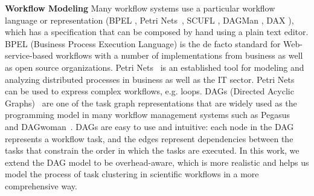 \textbf{Workflow Modeling} Many workflow systems use a particular workflow language or representation (BPEL \cite{BPEL}, Petri Nets~\cite{alt2006grid}, SCUFL \cite{Oinn2004}, DAGMan \cite{Kalayci2010}, DAX \cite{Deelman2005}), which has a specification that can be composed by hand using a plain text editor. BPEL (Business Process Execution Language) \cite{BPEL} is the de facto standard for Web-service-based workflows with a number of implementations from business as well as open source organizations. Petri Nets~\cite{alt2006grid} is an established tool for modeling and analyzing distributed processes in business as well as the IT sector. Petri Nets can be used to express complex workflows, e.g. loops. 
DAGs (Directed Acyclic Graphs)~\cite{Deelman2005} are one of the task graph representations that are widely used as the programming model in many workflow management systems such as Pegasus~\cite{Deelman2004} and DAGwoman~\cite{Tschager2012DAGwoman}. DAGs are easy to use and intuitive: each node in the DAG represents a workflow task, and the edges represent dependencies between the tasks that constrain the order in which the tasks are executed. 
In this work, we extend the DAG model to be overhead-aware, which is more realistic and helps us model the process of task clustering in scientific workflows in a more comprehensive way. 




